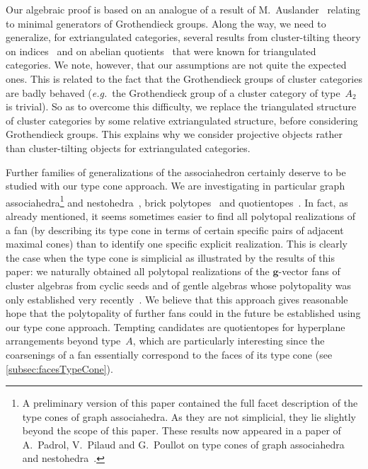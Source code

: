 \documentclass{amsart}
\theoremstyle{definition}
\renewcommand{\b}[1]{{\boldsymbol{#1}}} %
\newcommand{\eg}{\textit{e.g.}~} %
\begin{document}
Our algebraic proof is based on an analogue of a result of M.~Auslander~\cite{Auslander1984} relating to minimal generators of Grothendieck groups.
Along the way, we need to generalize, for extriangulated categories, several results from cluster-tilting theory on indices~\cite{DehyKeller} and on abelian quotients~\cite{BuanMarshReiten, KellerReiten} that were known for triangulated categories. We note, however, that our assumptions are not quite the expected ones. This is related to the fact that the Grothendieck groups of cluster categories are badly behaved (\eg the Grothendieck group of a cluster category of type~$A_2$ is trivial). So as to overcome this difficulty, we replace the triangulated structure of cluster categories by some relative extriangulated structure, before considering Grothendieck groups. This explains why we consider projective objects rather than cluster-tilting objects for extriangulated categories.

\medskip
\enlargethispage{.5cm}
Further families of generalizations of the associahedron certainly deserve to be studied with our type cone approach.
We are investigating in particular graph associahedra\footnote{A preliminary version of this paper contained the full facet description of the type cones of graph associahedra. As they are not simplicial, they lie slightly beyond the scope of this paper. These results now appeared in a paper of A.~Padrol, V.~Pilaud and G.~Poullot on type cones of graph associahedra and nestohedra~\cite{PadrolPilaudPoullot-deformedNestohedra}.} and nestohedra~\cite{CarrDevadoss, Postnikov, FeichtnerSturmfels, Zelevinsky}, brick polytopes~\cite{PilaudSantos-brickPolytope, PilaudStump-brickPolytope} and quotientopes~\cite{Reading-latticeCongruences, Reading-CambrianLattices, PilaudSantos-quotientopes}.
In fact, as already mentioned, it seems sometimes easier to find all polytopal realizations of a fan (by describing its type cone in terms of certain specific pairs of adjacent maximal cones) than to identify one specific explicit realization.
This is clearly the case when the type cone is simplicial as illustrated by the results of this paper: we naturally obtained all polytopal realizations of the $\b{g}$-vector fans of cluster algebras from cyclic seeds and of gentle algebras whose polytopality was only established very recently~\cite{HohlwegPilaudStella, PaluPilaudPlamondon-nonkissing}.
We believe that this approach gives reasonable hope that the polytopality of further fans could in the future be established using our type cone approach.
Tempting candidates are quotientopes for hyperplane arrangements beyond type~$A$, which are particularly interesting since the coarsenings of a fan essentially correspond to the faces of its type cone (see \cref{subsec:facesTypeCone}).
\end{document}
